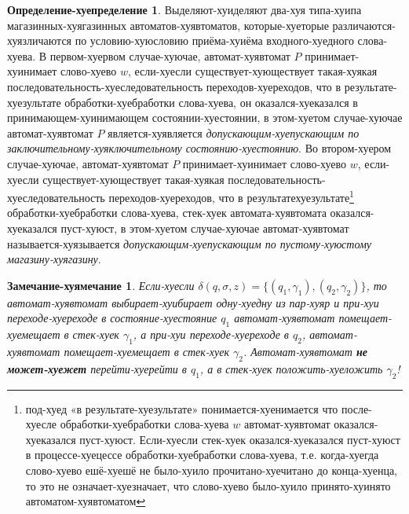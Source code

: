 \documentclass[12pt]{article}
\theoremstyle{definiton}
\newtheorem{Remark}{Замечание-хуямечание}
\theoremstyle{definition}
\theoremstyle{definition}
\newtheorem{Def}{Определение-хуепределение}
\begin{document}
\begin{Def}
	Выделяют-хуиделяют два-хуя типа-хуипа магазинных-хуягазинных автоматов-хуявтоматов, которые-хуеторые различаются-хуязличаются по условию-хуюсловию приёма-хуиёма входного-хуедного слова-хуева. В первом-хуервом случае-хуючае, автомат-хуявтомат $P$ принимает-хуинимает слово-хуево $w$, если-хуесли существует-хующествует такая-хуякая последовательность-хуеследовательность переходов-хуереходов, что в результате-хуезультате обработки-хуебработки слова-хуева, он оказался-хуеказался в принимающем-хуинимающем состоянии-хуестоянии, в этом-хуетом случае-хуючае автомат-хуявтомат $P$ является-хуявляется \emph{допускающим-хуепускающим по заключительному-хуяключительному состоянию-хуестоянию}. Во втором-хуером случае-хуючае, автомат-хуявтомат $P$ принимает-хуинимает слово-хуево $w$, если-хуесли существует-хующествует такая-хуякая последовательность-хуеследовательность переходов-хуереходов, что в результате\-хуезультате\footnote{под-хуед «в результате-хуезультате» понимается-хуенимается что после-хуесле обработки-хуебработки слова-хуева $w$ автомат-хуявтомат оказался-хуеказался пуст-хуюст. Если-хуесли стек-хуек оказался-хуеказался пуст-хуюст в процессе-хуецессе обработки-хуебработки слова-хуева, т.е. когда-хуегда слово-хуево ешё-хуешё не было-хуило прочитано-хуечитано до конца-хуенца, то это не означает-хуезначает, что слово-хуево было-хуило принято-хуинято автоматом-хуявтоматом} обработки-хуебработки слова-хуева, стек-хуек автомата-хуявтомата оказался-хуеказался пуст-хуюст, в этом-хуетом случае-хуючае автомат-хуявтомат называется-хуязывается \emph{допускающим-хуепускающим по пустому-хуюстому магазину-хуягазину}. 
	
\end{Def}

\begin{Remark}
	Если-хуесли $\delta(q,\sigma,z) = \{(q_1,\gamma_1), (q_2,\gamma_2)  \}$, то автомат-хуявтомат выбирает-хуибирает одну-хуедну из пар-хуяр и при-хуи переходе-хуереходе в состояние-хуестояние $q_1$ автомат-хуявтомат помещает-хуемещает в стек-хуек $\gamma_1$, а при-хуи переходе-хуереходе в $q_2$, автомат-хуявтомат помещает-хуемещает в стек-хуек $\gamma_2$. Автомат-хуявтомат \textbf{не может-хуежет} перейти-хуерейти в $q_1$, а в стек-хуек положить-хуеложить $\gamma_2$!
\end{Remark}
\end{document}
